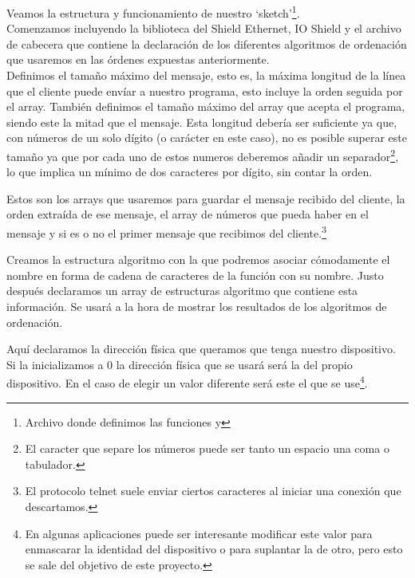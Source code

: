 Veamos la estructura y funcionamiento de nuestro `sketch'\protect\footnote{Archivo donde definimos las funciones  y }.\\

Comenzamos incluyendo la biblioteca del Shield Ethernet, IO Shield y el archivo de cabecera  que contiene la declaración de los diferentes algoritmos de ordenación que usaremos en las órdenes expuestas anteriormente.\\


Definimos el tamaño máximo del mensaje, esto es, la máxima longitud de la línea que el cliente puede envíar a nuestro programa, esto incluye la orden seguida por el array. También definimos el tamaño máximo del array que acepta el programa, siendo este la mitad que el mensaje. Esta longitud debería ser suficiente ya que, con números de un solo dígito (o carácter en este caso), no es posible superar este tamaño ya que por cada uno de estos numeros deberemos añadir un separador\protect\footnote{El caracter que separe los números puede ser tanto un espacio una coma o tabulador.}, lo que implica un mínimo de dos caracteres por dígito, sin contar la orden.


Estos son los arrays que usaremos para guardar el mensaje recibido del cliente, la orden extraída de ese mensaje, el array de números que pueda haber en el mensaje y si es o no el primer mensaje que recibimos del cliente.\protect\footnote{El protocolo telnet suele enviar ciertos caracteres al iniciar una conexión que descartamos.}


Creamos la estructura algoritmo con la que podremos asociar cómodamente el nombre en forma de cadena de caracteres de la función con su nombre. Justo después declaramos un array de estructuras algoritmo que contiene esta información. Se usará a la hora de mostrar los resultados de los algoritmos de ordenación.


Aquí declaramos la dirección física que queramos que tenga nuestro dispositivo. Si la inicializamos a 0 la dirección física que se usará será la del propio dispositivo. En el caso de elegir un valor diferente será este el que se use\protect\footnote{En algunas aplicaciones puede ser interesante modificar este valor para enmascarar la identidad del dispositivo o para suplantar la de otro, pero esto se sale del objetivo de este proyecto.}.

